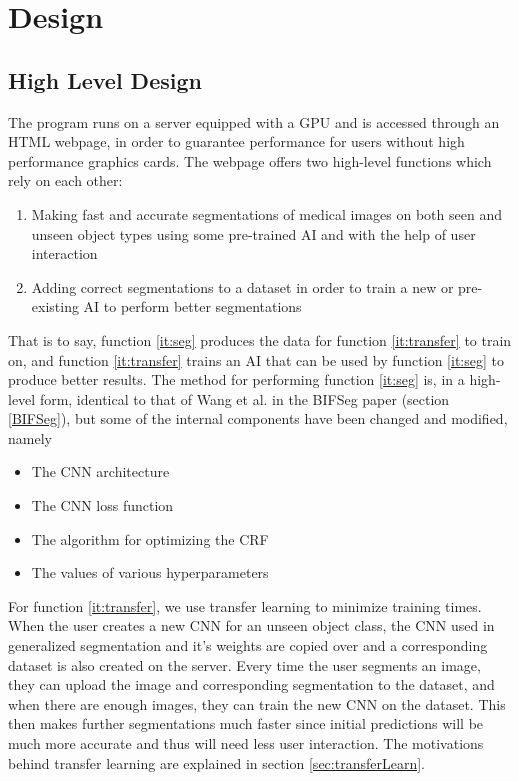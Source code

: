 
\section{Design}

\subsection{High Level Design}

The program runs on a server equipped with a GPU and is accessed through an HTML webpage, in order to guarantee performance for users without high performance graphics cards. The webpage offers two high-level functions which rely on each other:
\begin{enumerate}
\item \label{it:seg} Making fast and accurate segmentations of medical images on both seen and unseen object types using some pre-trained AI and with the help of user interaction
\item \label{it:transfer} Adding correct segmentations to a dataset in order to train a new or pre-existing AI to perform better segmentations
\end{enumerate}

That is to say, function \ref{it:seg} produces the data for function \ref{it:transfer} to train on, and function \ref{it:transfer} trains an AI that can be used by function \ref{it:seg} to produce better results. The method for performing function \ref{it:seg} is, in a high-level form, identical to that of Wang et al. in the BIFSeg paper \cite{BIFSeg} (section \ref{BIFSeg}), but some of the internal components have been changed and modified, namely
\begin{itemize}
\item The CNN architecture
\item The CNN loss function
\item The algorithm for optimizing the CRF
\item The values of various hyperparameters
\end{itemize}

For function \ref{it:transfer}, we use transfer learning to minimize training times. When the user creates a new CNN for an unseen object class, the CNN used in generalized segmentation and it's weights are copied over and a corresponding dataset is also created on the server. Every time the user segments an image, they can upload the image and corresponding segmentation to the dataset, and when there are enough images, they can train the new CNN on the dataset. This then makes further segmentations much faster since initial predictions will be much more accurate and thus will need less user interaction. The motivations behind transfer learning are explained in section \ref{sec:transferLearn}.

